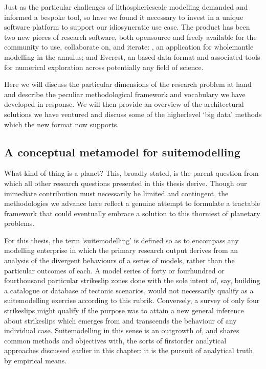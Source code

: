 \documentclass[letterpaper,10pt,english]{jupyterBook}
\begin{document}
\sphinxAtStartPar
Just as the particular challenges of lithospheric\sphinxhyphen{}scale modelling demanded and informed a bespoke tool, so have we found it necessary to invest in a unique software platform to support our idiosyncratic use case. The product has been two new pieces of research software, both open\sphinxhyphen{}source and freely available for the community to use, collaborate on, and iterate: , an  application for whole\sphinxhyphen{}mantle modelling in the annulus; and Everest, an \sphinxhyphen{}based data format and associated tools for numerical exploration across potentially any field of science.

\sphinxAtStartPar
Here we will discuss the particular dimensions of the research problem at hand and describe the peculiar methodological framework and vocabulary we have developed in response. We will then provide an overview of the architectural solutions we have ventured and discuss some of the higher\sphinxhyphen{}level ‘big data’ methods which the new format now supports.


\subsection{A conceptual meta\sphinxhyphen{}model for suite\sphinxhyphen{}modelling}
\label{\detokenize{content/chapter_02_methods/section3:a-conceptual-meta-model-for-suite-modelling}}
\sphinxAtStartPar
What kind of thing is a planet? This, broadly stated, is the parent question from which all other research questions presented in this thesis derive. Though our immediate contribution must necessarily be limited and contingent, the methodologies we advance here reflect a genuine attempt to formulate a tractable framework that could eventually embrace a solution to this thorniest of planetary problems.

\sphinxAtStartPar
For this thesis, the term ‘suite\sphinxhyphen{}modelling’ is defined so as to encompass any modelling enterprise in which the primary research output derives from an analysis of the divergent behaviours of a series of models, rather than the particular outcomes of each. A model series of forty or four\sphinxhyphen{}hundred or four\sphinxhyphen{}thousand particular strike\sphinxhyphen{}slip zones done with the sole intent of, say, building a catalogue or database of tectonic scenarios, would not necessarily qualify as a suite\sphinxhyphen{}modelling exercise according to this rubrik. Conversely, a survey of only four strike\sphinxhyphen{}slips might qualify if the purpose was to attain a new general inference about strike\sphinxhyphen{}slips which emerges from and transcends the behaviour of any individual case. Suite\sphinxhyphen{}modelling in this sense is an outgrowth of, and shares common methods and objectives with, the sorts of first\sphinxhyphen{}order analytical approaches discussed earlier in this chapter: it is the pursuit of analytical truth by empirical means.
\end{document}
